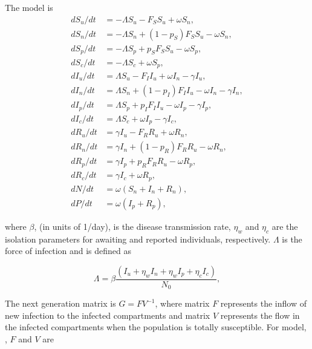 \documentclass[12pt]{article}
\theoremstyle{definition} %
\begin{document}
The model is 
\begin{align}
 d S_u/dt &= -\Lambda S_u - F_S S_u + \omega S_n, \label{eq1}\\
 d S_n/dt &= -\Lambda S_n + (1-p_S) F_S S_u - \omega S_n, \label{eq2}\\
 d S_p/dt &= -\Lambda S_p + p_S F_S S_u - \omega S_p, \label{eq3}\\
 d S_c/dt &= -\Lambda S_c + \omega S_p, \label{eq4}\\
 d I_u/dt &= \Lambda S_u - F_I I_u + \omega I_n  - \gamma I_u,  \label{eq5}\\
 d I_n/dt &= \Lambda S_n + (1-p_I) F_I I_u - \omega I_n -\gamma I_n, \label{eq6}\\
 d I_p/dt &= \Lambda S_p + p_I F_I I_u - \omega I_p -\gamma I_p, \label{eq7}\\
 d I_c/dt &= \Lambda S_c + \omega I_p - \gamma I_c,  \label{eq8}\\
 d R_u/dt &= \gamma I_u - F_R R_u + \omega R_n, \label{eq9}\\
 d R_n/dt &= \gamma I_n + (1-p_R) F_R R_u - \omega R_n,  \label{eq10}\\
 d R_p/dt &= \gamma I_p + p_R F_R R_u  - \omega R_p,  \label{eq11}\\
 d R_c/dt&= \gamma I_c + \omega R_p,  \label{eq12}\\
 dN/dt &= \omega (S_n + I_n + R_n),   \label{eq13}\\
 dP/dt &= \omega(I_p + R_p) \label{eq14},
\end{align}

where $\beta$, (in units of 1/day), is the disease transmission rate, $\eta_w$ and $\eta_c$ are the isolation parameters for awaiting and reported individuals, respectively. $\Lambda$ is the force of infection and is defined as 

\begin{equation}
\label{Lambda}
\Lambda=\beta \frac{(I_u+\eta_w I_n+\eta_w I_p+ \eta_c I_c)}{N_0},
\end{equation}


The next generation matrix is $G = F V^{-1}$, where matrix $F$ represents the inflow of new infection to the infected compartments and matrix $V$ represents the flow in the infected compartments when the population is totally susceptible. For model, , $F$ and $V$ are
\end{document}
